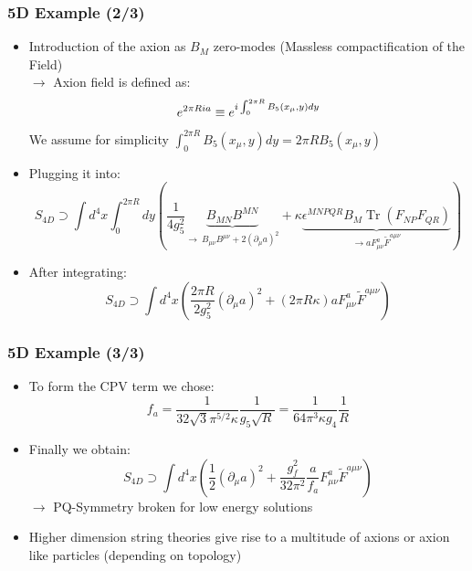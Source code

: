 \documentclass[aspectratio=1610, 9pt]{beamer}
\DeclareMathOperator{\Tr}{Tr}
\begin{document}
\begin{frame}
	\frametitle{5D Example (2/3)}
		\begin{itemize}
			\item Introduction of the axion as $B_M$ zero-modes (Massless compactification of the Field)\\
			$\rightarrow$ Axion field is defined as: 
			\begin{equation*}
				{\Large e^{2\pi R i a} \equiv e^{i\int_{0}^{2\pi R}B_5(x_\mu, y)dy}}
			\end{equation*}
			We assume for simplicity $\int_{0}^{2\pi R}B_5(x_\mu, y)dy = 2\pi RB_5(x_\mu, y)$
			\item Plugging it into:
			\begin{equation*}
				S_{4D} \supset \int d^4x \int_0^{2\pi R} dy \left( \frac{1}{4 g_5^2} \underbrace{B_{MN} B^{MN}}_{\rightarrow\ B_{\mu\nu}B^{\mu\nu} + 2(\partial_\mu a)^2} + \kappa \underbrace{\epsilon^{MNPQR} B_M \Tr(F_{NP} F_{QR})}_{\rightarrow aF_{\mu\nu}^a \tilde{F}^{a\mu\nu}} \right)
			\end{equation*}
			\item After integrating:
			\begin{equation*}
				S_{4D} \supset \int d^4x \left( \frac{2\pi R}{2g_5^2} (\partial_\mu a)^2 + (2\pi R \kappa) a F_{\mu\nu}^a \tilde{F}^{a\mu\nu} \right)
			\end{equation*}
		\end{itemize}
\end{frame}

\begin{frame}
	\frametitle{5D Example (3/3)}
	\begin{itemize}
		\item To form the CPV term we chose:
		\begin{equation*}
			f_a = \frac{1}{32 \sqrt{3} \pi^{5/2} \kappa} \frac{1}{g_5 \sqrt{R}} = \frac{1}{64 \pi^3 \kappa g_4} \frac{1}{R}
		\end{equation*}
		\item Finally we obtain:
		\begin{equation*}
			S_{4D} \supset \int d^4x \left( \frac{1}{2} (\partial_\mu a)^2 + \frac{g_f^2}{32 \pi^2} \frac{a}{f_a} F_{\mu\nu}^a \tilde{F}^{a\mu\nu} \right)
		\end{equation*}
		$\rightarrow$ PQ-Symmetry broken for low energy solutions
    \item Higher dimension string theories give rise to a multitude of axions or axion like particles (depending on topology)
	\end{itemize}
\end{frame}
\end{document}
